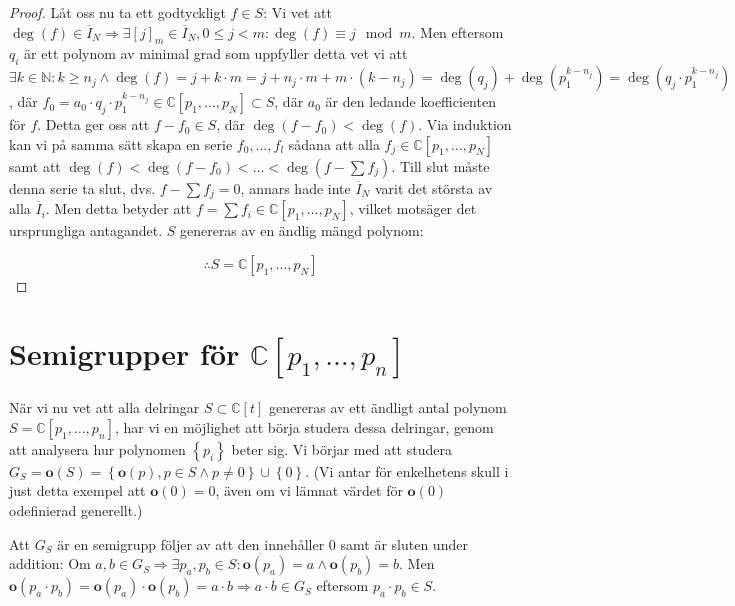 \begin{proof}
Låt oss nu ta ett godtyckligt $f \in S$: Vi vet att $\deg(f)\in \overline{I}_N \Longrightarrow \exists [j]_m \in \overline{I}_N, 0 \leq j < m : \deg(f) \equiv j \mod{m}$. Men eftersom $q_i$ är ett polynom av minimal grad som uppfyller detta vet vi att $\exists k \in \mathbb{N} : k\geq n_j \wedge \deg(f) = j + k\cdot m = j + n_j\cdot m + m\cdot(k-n_j) =\deg(q_j)+\deg(p_1^{k-n_j}) = \deg(q_j\cdot p_1^{k-n_j})$, där $f_0 = a_0\cdot q_j\cdot p_1^{k-n_j} \in \mathbb{C}[p_1,\ldots,p_N] \subset S$, där $a_0$ är den ledande koefficienten för $f$. Detta ger oss att $f-f_0 \in S$, där $\deg(f-f_0)<\deg(f)$. Via induktion kan vi på samma sätt skapa en serie $f_0,\ldots,f_l$ sådana att alla $f_j\in \mathbb{C}[p_1,\ldots,p_N]$ samt att $\deg(f)<\deg(f-f_0)<\ldots<\deg(f-\sum f_j)$. Till slut måste denna serie ta slut, dvs. $f-\sum f_j=0$, annars hade inte $\overline{I}_N$ varit det största av alla $\overline{I}_i$. Men detta betyder att $f = \sum f_i \in \mathbb{C}[p_1,\ldots,p_N]$, vilket motsäger det ursprungliga antagandet. $S$ genereras av en ändlig mängd polynom:

\[\therefore S=\mathbb{C}[p_1,\ldots,p_N]\]
\end{proof}

\section{Semigrupper för $\mathbb{C}[p_1,\ldots,p_n]$}

När vi nu vet att alla delringar $S \subset \mathbb{C}[t]$ genereras av ett ändligt antal polynom $S=\mathbb{C}[p_1,\ldots,p_n]$, har vi en möjlighet att börja studera dessa delringar, genom att analysera hur polynomen $\left\{p_i\right\}$ beter sig. Vi börjar med att studera $G_S = \mathbf{o}(S) = \left\{\mathbf{o}(p), p \in S \wedge p \neq 0 \right\} \cup \left\{0\right\}$. (Vi antar för enkelhetens skull i just detta exempel att $\mathbf{o}(0)=0$, även om vi lämnat värdet för $\mathbf{o}(0)$ odefinierad generellt.)

Att $G_S$ är en semigrupp följer av att den innehåller $0$ samt är sluten under addition: Om $a,b\in G_S \Longrightarrow \exists p_a, p_b \in S:\mathbf{o}(p_a)=a \wedge \mathbf{o}(p_b)=b$. Men $\mathbf{o}(p_a \cdot p_b) = \mathbf{o}(p_a) \cdot \mathbf{o}(p_b) = a \cdot b \Longrightarrow a \cdot b \in G_S$ eftersom $p_a \cdot p_b \in S$.

